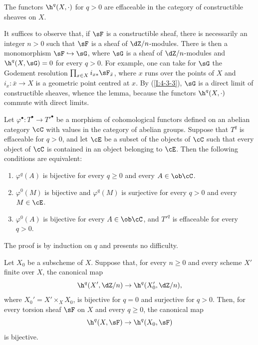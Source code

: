 \begin{lemma}\label{I:4-3-5}
The functors $\h^q(X,\cdot)$ for $q>0$ are effaceable in the category of
constructible sheaves on $X$.
\end{lemma}

It suffices to observe that, if $\sF$ is a constructible sheaf, there is
necessarily an integer $n>0$ such that $\sF$ is a sheaf of
$\dZ/n$-modules. There is then a monomorphism $\sF\hookrightarrow\sG$,
where $\sG$ is a sheaf of $\dZ/n$-modules and
$\h^q(X,\sG)=0$ for every $q>0$. For example, one can take for $\sG$
the Godement resolution $\prod_{x\in X}i_{x*}\sF_{\bar x}$, where $x$
runs over the points of $X$ and $i_x:\bar x\to X$ is a geometric point
centred at $x$. By (\ref{I:4-3-3}), $\sG$ is a direct limit of
constructible sheaves, whence the lemma, because the functors
$\h^q(X,\cdot)$ commute with direct limits.

\begin{lemma}\label{I:4-3-6}
Let $\varphi^\bullet:T^\bullet\to{T'}^\bullet$ be a morphism of
cohomological functors defined on an abelian category $\cC$ with values
in the category of abelian groups. Suppose that $T^q$ is effaceable for
$q>0$, and let $\cE$ be a subset of the objects of $\cC$ such that
every object of $\cC$ is contained in an object belonging to $\cE$.
Then the following conditions are equivalent:
\begin{enumerate}[\indent (i)]
  \item $\varphi^q(A)$ is bijective for every $q\geqslant0$ and every
    $A\in\ob\cC$.
  \item $\varphi^0(M)$ is bijective and $\varphi^q(M)$ is surjective for
    every $q>0$ and every $M\in\cE$.
  \item $\varphi^0(A)$ is bijective for every $A\in\ob\cC$, and
    ${T'}^q$ is effaceable for every $q>0$.
\end{enumerate}
\end{lemma}

The proof is by induction on $q$ and presents no difficulty.

\begin{proposition}\label{I:4-3-7}
Let $X_0$ be a subscheme of $X$. Suppose that, for every $n\geqslant0$ and every scheme $X'$ finite over $X$, the canonical map
\[
  \h^q(X',\dZ/n) \to \h^q(X_0',\dZ/n)\text{,}
\]
where $X_0'=X'\times_XX_0$, is bijective for $q=0$ and surjective for
$q>0$. Then, for every torsion sheaf $\sF$ on $X$ and every
$q\geqslant0$, the canonical map
\[
  \h^q(X,\sF) \to \h^q(X_0,\sF)
\]
is bijective.
\end{proposition}

